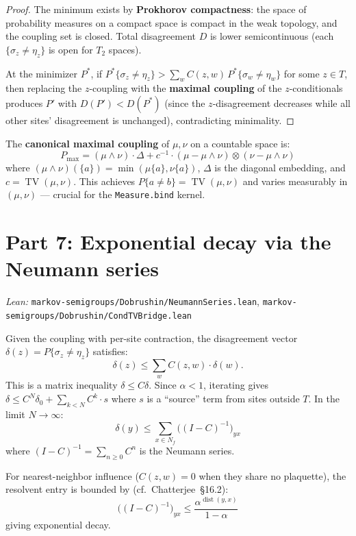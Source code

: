 \documentclass[11pt,a4paper]{article}
\theoremstyle{definition}
\newcommand{\TV}{\operatorname{TV}}
\begin{document}
\begin{proof}
The minimum exists by \textbf{Prokhorov compactness}: the space
of probability measures on a compact space is compact in the weak
topology, and the coupling set is closed. Total disagreement $D$
is lower semicontinuous (each $\{\sigma_z \neq \eta_z\}$ is open
for $T_2$ spaces).

At the minimizer $P^*$, if
$P^*\{\sigma_z \neq \eta_z\} > \sum_w C(z,w)\, P^*\{\sigma_w \neq \eta_w\}$
for some $z \in T$, then replacing the $z$-coupling with the
\textbf{maximal coupling} of the $z$-conditionals produces $P'$
with $D(P') < D(P^*)$ (since the $z$-disagreement decreases while
all other sites' disagreement is unchanged), contradicting
minimality.
\end{proof}

The \textbf{canonical maximal coupling} of $\mu, \nu$ on a
countable space is:
\[
  P_{\max} = (\mu \wedge \nu) \cdot \Delta
  + c^{-1} \cdot (\mu - \mu \wedge \nu)
             \otimes (\nu - \mu \wedge \nu)
\]
where $(\mu \wedge \nu)(\{a\}) = \min(\mu\{a\}, \nu\{a\})$,
$\Delta$ is the diagonal embedding, and $c = \TV(\mu, \nu)$. This
achieves $P\{a \neq b\} = \TV(\mu, \nu)$ and varies measurably in
$(\mu, \nu)$ --- crucial for the \texttt{Measure.bind} kernel.

\section{Part 7: Exponential decay via the Neumann series}

\textit{Lean:} \texttt{markov-semigroups/Dobrushin/NeumannSeries.lean},
\texttt{markov-semigroups/Dobrushin/CondTVBridge.lean}

\medskip

Given the coupling with per-site contraction, the disagreement
vector $\delta(z) = P\{\sigma_z \neq \eta_z\}$ satisfies:
\[
  \delta(z) \leq \sum_w C(z, w) \cdot \delta(w).
\]
This is a matrix inequality $\delta \leq C\delta$. Since $\alpha < 1$,
iterating gives $\delta \leq C^N \delta_0 + \sum_{k<N} C^k \cdot s$
where $s$ is a ``source'' term from sites outside $T$. In the limit
$N \to \infty$:
\[
  \delta(y) \leq \sum_{x \in N_f} \bigl((I - C)^{-1}\bigr)_{yx}
\]
where $(I - C)^{-1} = \sum_{n \geq 0} C^n$ is the Neumann series.

For nearest-neighbor influence ($C(z, w) = 0$ when they share no
plaquette), the resolvent entry is bounded by
(cf.\ Chatterjee~\S16.2):
\[
  \bigl((I - C)^{-1}\bigr)_{yx}
  \leq \frac{\alpha^{\operatorname{dist}(y, x)}}{1 - \alpha}
\]
giving exponential decay.
\end{document}

